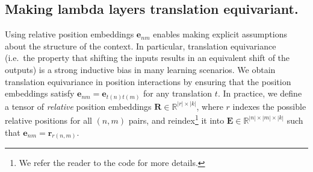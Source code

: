 \documentclass{article} \usepackage{iclr2021_conference,times}
\begin{document}
\vspace{-0.1cm}
\subsection{Making lambda layers translation equivariant.}
Using relative position embeddings $\boldsymbol{e}_{nm}$ enables making explicit assumptions about the structure of the context.
In particular, translation equivariance (i.e.\ the property that shifting the inputs results in an equivalent shift of the outputs) is a strong inductive bias in many learning scenarios.
We obtain translation equivariance in position interactions by ensuring that the position embeddings satisfy $\boldsymbol{e}_{nm} = \boldsymbol{e}_{t(n)t(m)}$ for any translation $t$.
In practice, we define a tensor of \emph{relative} position embeddings $\boldsymbol{R} \in \mathbb{R}^{|r| \times |k|}$, where $r$ indexes the possible relative positions for all $(n, m)$ pairs, and reindex\footnote{We refer the reader to the code for more details.} it into $\boldsymbol{E} \in \mathbb{R}^{|n| \times |m| \times |k|}$ such that $\boldsymbol{e}_{nm} = \boldsymbol{r}_{r(n,m)}$.

\vspace{-0.1cm}
\end{document}
